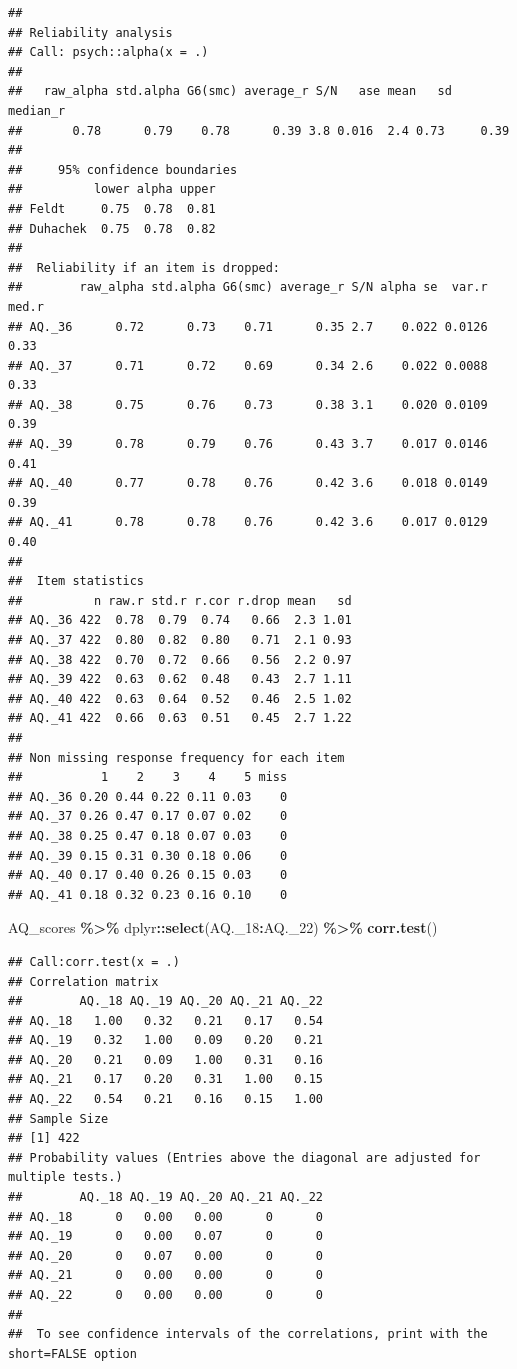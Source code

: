 \documentclass[
]{article}
\newenvironment{Shaded}{\begin{snugshade}}{\end{snugshade}}
\newcommand{\FunctionTok}[1]{\textcolor[rgb]{0.13,0.29,0.53}{\textbf{#1}}}
\newcommand{\NormalTok}[1]{#1}
\newcommand{\SpecialCharTok}[1]{\textcolor[rgb]{0.81,0.36,0.00}{\textbf{#1}}}
\begin{document}
\begin{verbatim}
## 
## Reliability analysis   
## Call: psych::alpha(x = .)
## 
##   raw_alpha std.alpha G6(smc) average_r S/N   ase mean   sd median_r
##       0.78      0.79    0.78      0.39 3.8 0.016  2.4 0.73     0.39
## 
##     95% confidence boundaries 
##          lower alpha upper
## Feldt     0.75  0.78  0.81
## Duhachek  0.75  0.78  0.82
## 
##  Reliability if an item is dropped:
##        raw_alpha std.alpha G6(smc) average_r S/N alpha se  var.r med.r
## AQ._36      0.72      0.73    0.71      0.35 2.7    0.022 0.0126  0.33
## AQ._37      0.71      0.72    0.69      0.34 2.6    0.022 0.0088  0.33
## AQ._38      0.75      0.76    0.73      0.38 3.1    0.020 0.0109  0.39
## AQ._39      0.78      0.79    0.76      0.43 3.7    0.017 0.0146  0.41
## AQ._40      0.77      0.78    0.76      0.42 3.6    0.018 0.0149  0.39
## AQ._41      0.78      0.78    0.76      0.42 3.6    0.017 0.0129  0.40
## 
##  Item statistics 
##          n raw.r std.r r.cor r.drop mean   sd
## AQ._36 422  0.78  0.79  0.74   0.66  2.3 1.01
## AQ._37 422  0.80  0.82  0.80   0.71  2.1 0.93
## AQ._38 422  0.70  0.72  0.66   0.56  2.2 0.97
## AQ._39 422  0.63  0.62  0.48   0.43  2.7 1.11
## AQ._40 422  0.63  0.64  0.52   0.46  2.5 1.02
## AQ._41 422  0.66  0.63  0.51   0.45  2.7 1.22
## 
## Non missing response frequency for each item
##           1    2    3    4    5 miss
## AQ._36 0.20 0.44 0.22 0.11 0.03    0
## AQ._37 0.26 0.47 0.17 0.07 0.02    0
## AQ._38 0.25 0.47 0.18 0.07 0.03    0
## AQ._39 0.15 0.31 0.30 0.18 0.06    0
## AQ._40 0.17 0.40 0.26 0.15 0.03    0
## AQ._41 0.18 0.32 0.23 0.16 0.10    0
\end{verbatim}

\begin{Shaded}
\begin{Highlighting}[]
\NormalTok{AQ\_scores }\SpecialCharTok{\%\textgreater{}\%}\NormalTok{ dplyr}\SpecialCharTok{::}\FunctionTok{select}\NormalTok{(AQ.\_18}\SpecialCharTok{:}\NormalTok{AQ.\_22) }\SpecialCharTok{\%\textgreater{}\%} \FunctionTok{corr.test}\NormalTok{()}
\end{Highlighting}
\end{Shaded}

\begin{verbatim}
## Call:corr.test(x = .)
## Correlation matrix 
##        AQ._18 AQ._19 AQ._20 AQ._21 AQ._22
## AQ._18   1.00   0.32   0.21   0.17   0.54
## AQ._19   0.32   1.00   0.09   0.20   0.21
## AQ._20   0.21   0.09   1.00   0.31   0.16
## AQ._21   0.17   0.20   0.31   1.00   0.15
## AQ._22   0.54   0.21   0.16   0.15   1.00
## Sample Size 
## [1] 422
## Probability values (Entries above the diagonal are adjusted for multiple tests.) 
##        AQ._18 AQ._19 AQ._20 AQ._21 AQ._22
## AQ._18      0   0.00   0.00      0      0
## AQ._19      0   0.00   0.07      0      0
## AQ._20      0   0.07   0.00      0      0
## AQ._21      0   0.00   0.00      0      0
## AQ._22      0   0.00   0.00      0      0
## 
##  To see confidence intervals of the correlations, print with the short=FALSE option
\end{verbatim}
\end{document}
